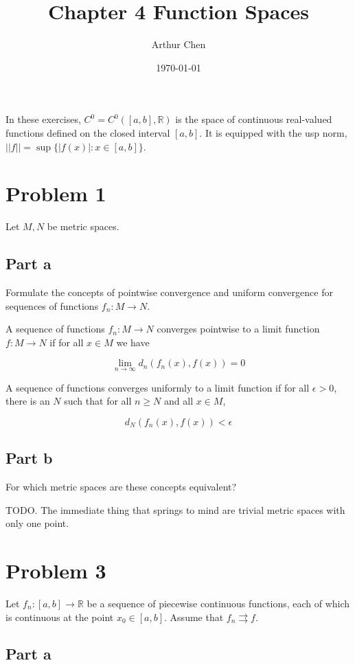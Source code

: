 \documentclass{article}
\author{Arthur Chen}
\title{Chapter 4 Function Spaces}
\date{\today}
\newcommand{\R}{\mathbb{R}}
\begin{document}
\maketitle

In these exercises, $C^0 = C^0([a, b], \R)$ is the space of continuous real-valued functions defined on the closed interval $[a, b]$. It is equipped with the usp norm, $||f|| = \sup \{|f(x)|: x \in [a, b]\}$.

\section*{Problem 1}

Let $M, N$ be metric spaces.

\subsection*{Part a}

Formulate the concepts of pointwise convergence and uniform convergence for sequences of functions $f_n: M \rightarrow N$.

A sequence of functions $f_n: M \rightarrow N$ converges pointwise to a limit function $f: M \rightarrow N$ if for all $x \in M$ we have

\[
\lim_{n \rightarrow \infty} d_n(f_n(x), f(x)) = 0
\]

A sequence of functions converges uniformly to a limit function if for all $\epsilon > 0$, there is an $N$ such that for all $n \geq N$ and all $x \in M$,

\[
d_N(f_n(x), f(x)) < \epsilon
\]

\subsection*{Part b}

For which metric spaces are these concepts equivalent?

TODO. The immediate thing that springs to mind are trivial metric spaces with only one point.

\section*{Problem 3}

Let $f_n: [a, b] \rightarrow \R$ be a sequence of piecewise continuous functions, each of which is continuous at the point $x_0 \in [a, b]$. Assume that $f_n \rightrightarrows f$.

\subsection*{Part a}
\end{document}
